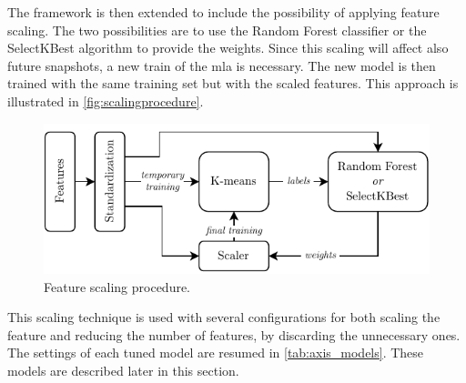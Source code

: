 The framework is then extended to include the possibility of applying feature scaling. The two possibilities are to use the Random Forest classifier or the SelectKBest algorithm to provide the weights. Since this scaling will affect also future snapshots, a new train of the \gls{mla} is necessary. The new model is then trained with the same training set but with the scaled features. This approach is illustrated in \autoref{fig:scalingprocedure}.

\begin{figure}[h!]
    \centering
    \includegraphics{images/LinearMotor/Feat_scaling.pdf}
    \caption{Feature scaling procedure.}
    \label{fig:scalingprocedure}
\end{figure}

This scaling technique is used with several configurations for both scaling the feature and reducing the number of features, by discarding the unnecessary ones. The settings of each tuned model are resumed in \autoref{tab:axis_models}. These models are described later in this section.

